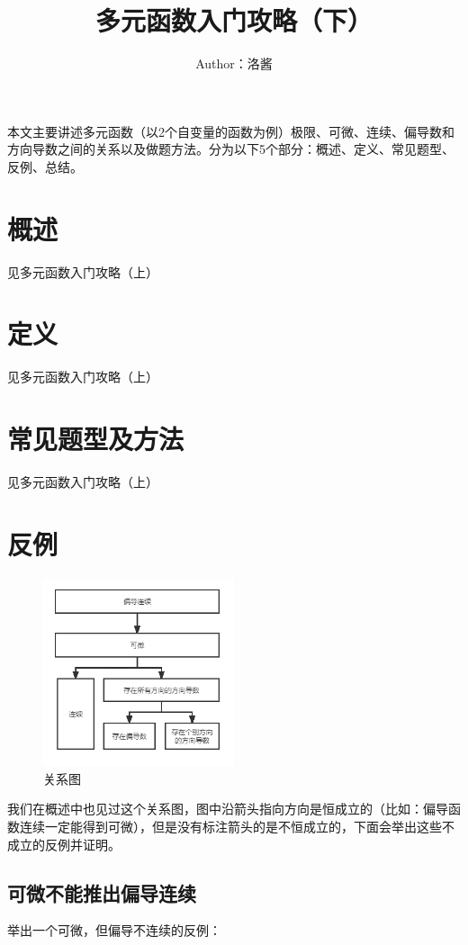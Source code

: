 \documentclass{article}
\title{多元函数入门攻略（下）}
\date{}
\author{Author：洛酱}
\begin{document}
\maketitle


本文主要讲述多元函数（以2个自变量的函数为例）极限、可微、连续、偏导数和方向导数之间的关系以及做题方法。分为以下5个部分：概述、定义、常见题型、反例、总结。



\tableofcontents

\newpage
\setcounter{page}{1}

\section{概述}
见多元函数入门攻略（上）

\section{定义}
见多元函数入门攻略（上）

\section{常见题型及方法}
见多元函数入门攻略（上）

\section{反例}
\begin{figure}[!h]
    \centering
    \includegraphics[width=0.5\textwidth]{pic/01.png}
    \caption{关系图}
\end{figure}

我们在概述中也见过这个关系图，图中沿箭头指向方向是恒成立的（比如：偏导函数连续一定能得到可微），但是没有标注箭头的是不恒成立的，下面会举出这些不成立的反例并证明。

\subsection{可微不能推出偏导连续}
举出一个可微，但偏导不连续的反例：
\end{document}
